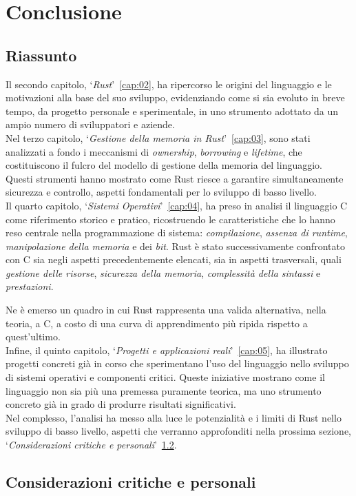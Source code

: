 
\chapter{Conclusione}\label{cap:06}
\section{Riassunto}
Il secondo capitolo, `\textit{Rust}'~\ref{cap:02}, ha ripercorso le origini del linguaggio e le motivazioni alla base del suo sviluppo, 
evidenziando come si sia evoluto in breve tempo, da progetto personale e sperimentale, in uno strumento adottato da un ampio numero di sviluppatori e aziende. \hfill
\vspace{10pt}\\
\noindent Nel terzo capitolo, `\textit{Gestione della memoria in Rust}'~\ref{cap:03}, sono stati analizzati a fondo i meccanismi di \textit{ownership}, \textit{borrowing} e \textit{lifetime}, che costituiscono 
il fulcro del modello di gestione della memoria del linguaggio. 
Questi strumenti hanno mostrato come Rust riesce a garantire simultaneamente sicurezza e controllo, aspetti
fondamentali per lo sviluppo di basso livello. \hfill
\vspace{10pt}\\
\noindent Il quarto capitolo, `\textit{Sistemi Operativi}'~\ref{cap:04}, ha preso in analisi il linguaggio C come riferimento
storico e pratico, ricostruendo le caratteristiche che lo hanno reso centrale nella programmazione di sistema: 
\textit{compilazione}, \textit{assenza di runtime}, \textit{manipolazione della memoria} e dei \textit{bit}.
Rust è stato successivamente confrontato con C sia negli aspetti precedentemente elencati, sia in 
aspetti trasversali, quali \textit{gestione delle risorse}, \textit{sicurezza della memoria}, \textit{complessità della sintassi} e \textit{prestazioni}.

Ne è emerso un quadro in cui Rust rappresenta una valida alternativa, nella teoria, a C, 
a costo di una curva di apprendimento più ripida rispetto a quest'ultimo. \hfill
\vspace{10pt}\\
\noindent Infine, il quinto capitolo, `\textit{Progetti e applicazioni reali}'~\ref{cap:05}, ha illustrato progetti
concreti già in corso che sperimentano l'uso del linguaggio nello sviluppo di sistemi operativi e 
componenti critici. Queste iniziative mostrano come il linguaggio non sia più una 
premessa puramente teorica, ma uno strumento concreto già in grado di produrre risultati significativi. \hfill
\vspace{10pt}\\
\noindent Nel complesso, l'analisi ha messo alla luce le potenzialità e i limiti di Rust nello sviluppo di 
basso livello, aspetti che verranno approfonditi nella prossima sezione, `\textit{Considerazioni critiche e personali}'~\ref{sec:critique}.

\section{Considerazioni critiche e personali}\label{sec:critique}